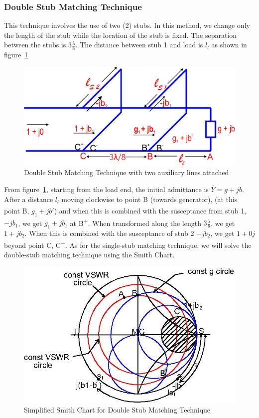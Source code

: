 \subsubsection{Double Stub Matching Technique}
This technique involves the use of two (2) stubs. In this method, we change only the length of the stub while the location of the stub is fixed. The separation between the stubs is $3\frac{\lambda}{8}$. The distance between stub 1 and load is $l_l$ as shown in figure~\ref{fig:fig12}
\begin{figure}[h]
\centering
\includegraphics[width=1\linewidth]{./graphics/fig12}
\caption{Double Stub Matching Technique with two auxiliary lines attached}
\label{fig:fig12}
\end{figure}
From figure~\ref{fig:fig12}, starting from the load end, the initial admittance is $\bar{Y} = g + jb$. After a distance $l_l$ moving clockwise to point B (towards generator), (at this point B\textsuperscript{\textemdash}, $g_1 + jb'$) and when this is combined with the susceptance from stub 1, $-jb_1$, we get $g_1 +jb_1$ at B\textsuperscript{+}. When transformed along the length $3\frac{\lambda}{8}$, we get $1 + jb_2$. When this is combined with the susceptance of stub 2 $-jb_2$, we get $1 + 0j$ beyond point C, C\textsuperscript{+}. As for the single-stub matching technique, we will solve the double-stub matching technique using the Smith Chart.
\begin{figure}[h]
\centering
\includegraphics[width=1\linewidth]{./graphics/dousmith}
\caption{Simplified Smith Chart for Double Stub Matching Technique}
\label{fig:dousmith}
\end{figure}

